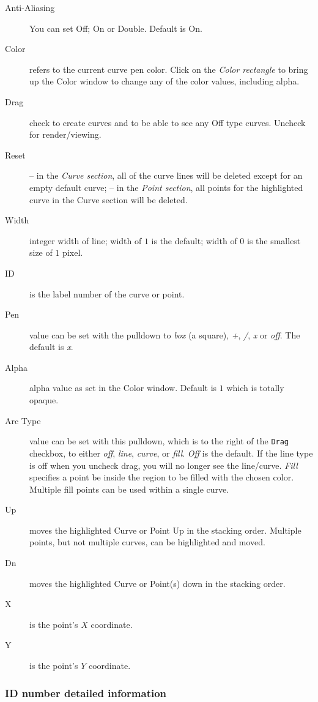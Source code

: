 \begin{description}
	\item[Anti-Aliasing] You can set Off; On or Double. Default is On.
    \item[Color] refers to the current curve pen color. Click on the \textit{Color rectangle} to bring up the Color window to change any of the color values, including alpha.
    \item[Drag] check to create curves and to be able to see any Off type curves. Uncheck for render/viewing.
    \item[Reset] -- in the \textit{Curve section}, all of the curve lines will be deleted except for an empty default curve;
    -- in the \textit{Point section}, all points for the highlighted curve in the Curve section will be deleted.
    \item[Width] integer width of line; width of $1$ is the default; width of $0$ is the smallest size of $1$ pixel.
    \item[ID] is the label number of the curve or point.
    \item[Pen] value can be set with the pulldown to \textit{box} (a square), \textit{+}, \textit{/}, \textit{x} or \textit{off}. The default is \textit{x}.
    \item[Alpha] alpha value as set in the Color window. Default is $1$ which is totally opaque.
    \item[Arc Type] value can be set with this pulldown, which is to the right of the \texttt{Drag} checkbox, to either \textit{off}, \textit{line}, \textit{curve}, or \textit{fill}. \textit{Off} is the default. If the line type is off when you uncheck drag, you will no longer see the line/curve. \textit{Fill} specifies a point be inside the region to be filled with the chosen color. Multiple fill points can be used within a single curve.
    \item[Up] moves the highlighted Curve or Point Up in the stacking order. Multiple points, but not multiple curves, can be highlighted and moved.
    \item[Dn] moves the highlighted Curve or Point(s) down in the stacking order.
    \item[X] is the point’s $X$ coordinate.
    \item[Y] is the point’s $Y$ coordinate.
\end{description}

\subsubsection*{ID number detailed information}%
\label{ssub:id_number_detailed_information}

